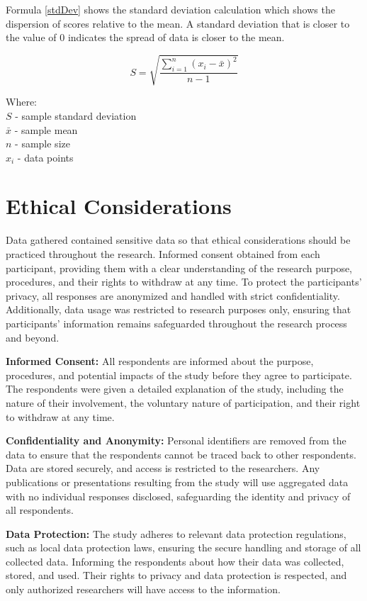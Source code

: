	Formula \ref{stdDev} shows the standard deviation calculation which shows the dispersion of scores relative to the mean. A standard deviation  that is closer to the value of 0 indicates the spread of data is closer to the mean.
	
	\begin{equation} 
		\label{stdDev}
		S = \sqrt{\frac{\sum_{i=1}^{n} (x_{i} - \bar{x} )^2 }{n-1}}
	\end{equation}
	
	\noindent Where:
	\\$S$ - sample standard deviation
	\\$\bar{x}$ - sample mean
	\\$n$ - sample size
	\\$x_{i}$ - data points
	

\section{Ethical Considerations}
	Data gathered contained sensitive data so that ethical considerations should be practiced throughout the research.  Informed consent obtained from each participant, providing them with a clear understanding of the research purpose, procedures, and their rights to withdraw at any time. To protect the participants’ privacy, all responses are anonymized and handled with strict confidentiality. Additionally, data usage was restricted to research purposes only, ensuring that participants' information remains safeguarded throughout the research process and beyond. 
	
	\textbf{Informed Consent:} All respondents are informed about the purpose, procedures, and potential impacts of the study before they agree to participate. The respondents were given a detailed explanation of the study, including the nature of their involvement, the voluntary nature of participation, and their right to withdraw at any time.
	
	\textbf{Confidentiality and Anonymity:} Personal identifiers are removed from the data to ensure that the respondents cannot be traced back to other respondents. Data are stored securely, and access is restricted to the researchers. Any publications or presentations resulting from the study will use aggregated data with no individual responses disclosed, safeguarding the identity and privacy of all respondents.
	
	\textbf{Data Protection:} The study adheres to relevant data protection regulations, such as local data protection laws, ensuring the secure handling and storage of all collected data. Informing the respondents about how their data was collected, stored, and used. Their rights to privacy and data protection is respected, and only authorized researchers will have access to the information.
	
